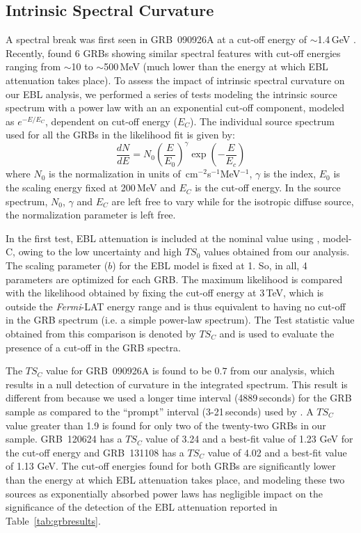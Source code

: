 \documentclass[12pt,preprint]{aastex}
\begin{document}
\subsection{Intrinsic Spectral Curvature}
\label{ssec:expcutoff}

A spectral break was first {seen in} GRB~090926A 
at a cut-off energy of $\sim$1.4\,GeV \citep{cutoff09}. Recently, \cite{tang2015}
found 6 GRBs showing similar spectral features with cut-off energies
ranging from $\sim$10 to $\sim$500\,MeV ({much lower than
  the energy at which EBL attenuation takes place}).
To assess the impact of intrinsic spectral curvature on our EBL
analysis, we performed {a series of tests} modeling the intrinsic
source spectrum with a power law with an  an exponential cut-off
component, modeled as $e^{-E/{E_C}}$, 
dependent on cut-off energy ($E_C$). The individual source spectrum used for all the GRBs in the 
likelihood fit is given by:
\begin{equation}
    \frac{dN}{dE}=N_0 \left ( {\frac{E}{E_0}} \right )^{\gamma} \exp \left (- {\frac{E}{E_c}} \right )
\end{equation}
where $N_0$ is the normalization in units of $\,$cm$^{-2}$s$^{-1}$MeV$^{-1}$, $\gamma$ is the index, $E_0$ is the scaling energy fixed 
at 200\,MeV and $E_C$ is the cut-off energy. 
In the source spectrum, $N_0$, $\gamma$ and $E_C$ are left free to vary while for the isotropic diffuse
source, the normalization parameter 
 is left free.


{In the first test}, EBL attenuation  is included
at the nominal value using \cite{finke10}, model-C, {owing to the low uncertainty and high $TS_0$ values obtained from our analysis.}
The scaling parameter ($b$) for the EBL 
model is fixed at 1.
So, in all, 4 parameters are optimized for
each GRB. The maximum likelihood is compared with the likelihood obtained by fixing the cut-off energy at 
3\,TeV, which is outside the {\it Fermi}-LAT energy range and is thus equivalent to
having no cut-off in the GRB spectrum (i.e. a simple power-law spectrum).
The Test statistic value obtained from this comparison is denoted by $TS_C$ and is used 
to evaluate the presence of a cut-off in the GRB spectra.

The $TS_C$ value for GRB~090926A is found to be $0.7$ from our analysis, 
which results in a null detection of curvature in the integrated spectrum.
This result is different from \cite{cutoff09} because we used a longer time interval (4889\,seconds) for the GRB sample as compared to the
``prompt'' interval (3-21\,seconds) used by \cite{cutoff09}.
A $TS_C$ value greater than 1.9 is found for only two of the {twenty-two} GRBs in our sample.
GRB~120624 has a $TS_C$ value of 
3.24 and a best-fit value of 1.23 GeV for the cut-off energy and GRB~131108 has a $TS_C$ value of 
4.02 and a best-fit value of 1.13 GeV. The cut-off energies {found for both
GRBs} are significantly
lower than the energy at which EBL attenuation takes place, {and
modeling these two sources as exponentially absorbed power laws has
negligible impact on the significance of the detection of the EBL
attenuation reported in Table~\ref{tab:grbresults}.}
\end{document}
